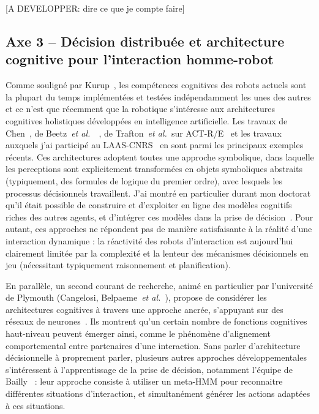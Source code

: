 \documentclass[a4paper]{article}
\newcommand{\etal}{{\textit{et al.~}}}
\begin{document}
[A DEVELOPPER: dire ce que je compte faire]

\subsection*{Axe 3 -- Décision distribuée et architecture cognitive pour l'interaction homme-robot}

Comme souligné par Kurup~\cite{kurup2012what}, les compétences cognitives des
robots actuels sont la plupart du temps implémentées et testées indépendamment
les unes des autres et ce n'est que récemment que la robotique s'intéresse aux
architectures cognitives holistiques développées en intelligence artificielle.
Les travaux de Chen~\cite{Chen2010}, de Beetz~\etal~\cite{Beetz2010}, de
Trafton~\etal sur ACT-R/E~\cite{trafton2013act} et les travaux auxquels j'ai
participé au LAAS-CNRS~\cite{lemaignan2014human} en sont parmi les principaux
exemples récents. Ces architectures adoptent toutes une approche symbolique,
dans laquelle les perceptions sont explicitement transformées en objets
symboliques abstraits (typiquement, des formules de logique du premier ordre),
avec lesquels les processus décisionnels travaillent. J'ai montré en particulier
durant mon doctorat qu'il était possible de construire et d'exploiter en ligne
des modèles cognitifs riches des autres agents, et d'intégrer ces modèles dans
la prise de décision~\cite{alami2011when, warnier2012when, lemaignan2014human}.
Pour autant, ces approches ne répondent pas de manière satisfaisante à la
réalité d'une interaction dynamique : la réactivité des robots d'interaction est
aujourd'hui clairement limitée par la complexité et la lenteur des mécanismes
décisionnels en jeu (nécessitant typiquement raisonnement et planification).

En parallèle, un second courant de recherche, animé en particulier par
l'université de Plymouth (Cangelosi, Belpaeme~\etal), propose de considérer les
architectures cognitives à travers une approche
ancrée, s'appuyant sur des réseaux de neurones~\cite{morse2010epigenetic,
baxter2013cognitive}. Ils montrent qu'un certain nombre de fonctions cognitives
haut-niveau peuvent émerger ainsi, comme le phénomène d'alignement
comportemental entre partenaires d'une interaction.
Sans parler d'architecture décisionnelle à proprement parler, plusieurs autres
approches développementales s'intéressent à l'apprentissage de la prise de
décision, notamment l'équipe de Bailly~\cite{mihoub2014modeling} : leur approche
consiste à utiliser un meta-HMM pour reconnaitre différentes situations
d'interaction, et simultanément générer les actions adaptées à ces situations.
\end{document}

